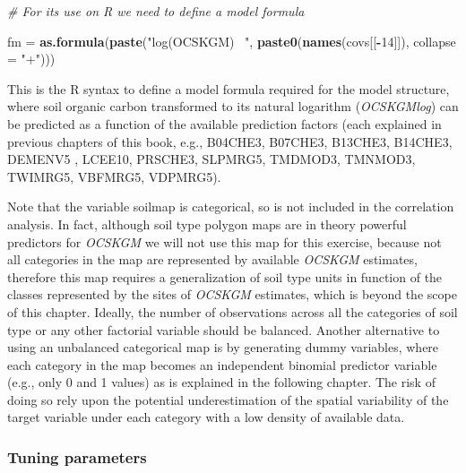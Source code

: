 \documentclass[10pt,b5paper,]{book}
\newenvironment{Shaded}{\begin{snugshade}}{\end{snugshade}}
\newcommand{\CommentTok}[1]{\textcolor[rgb]{0.56,0.35,0.01}{\textit{#1}}}
\newcommand{\DataTypeTok}[1]{\textcolor[rgb]{0.13,0.29,0.53}{#1}}
\newcommand{\DecValTok}[1]{\textcolor[rgb]{0.00,0.00,0.81}{#1}}
\newcommand{\KeywordTok}[1]{\textcolor[rgb]{0.13,0.29,0.53}{\textbf{#1}}}
\newcommand{\NormalTok}[1]{#1}
\newcommand{\OperatorTok}[1]{\textcolor[rgb]{0.81,0.36,0.00}{\textbf{#1}}}
\newcommand{\StringTok}[1]{\textcolor[rgb]{0.31,0.60,0.02}{#1}}
\theoremstyle{definition}
\theoremstyle{definition}
\theoremstyle{definition}
\theoremstyle{remark}
\begin{document}
\begin{Shaded}
\begin{Highlighting}[]
\CommentTok{# For its use on R we need to define a model formula}

\NormalTok{fm =}\StringTok{ }\KeywordTok{as.formula}\NormalTok{(}\KeywordTok{paste}\NormalTok{(}\StringTok{"log(OCSKGM) ~"}\NormalTok{, }\KeywordTok{paste0}\NormalTok{(}\KeywordTok{names}\NormalTok{(covs[[}\OperatorTok{-}\DecValTok{14}\NormalTok{]]),}
                                            \DataTypeTok{collapse =} \StringTok{"+"}\NormalTok{))) }
\end{Highlighting}
\end{Shaded}

This is the R syntax to define a model formula required for the model
structure, where soil organic carbon transformed to its natural
logarithm (\emph{OCSKGMlog}) can be predicted as a function of the
available prediction factors (each explained in previous chapters of
this book, e.g., B04CHE3, B07CHE3, B13CHE3, B14CHE3, DEMENV5 , LCEE10,
PRSCHE3, SLPMRG5, TMDMOD3, TMNMOD3, TWIMRG5, VBFMRG5, VDPMRG5).

Note that the variable soilmap is categorical, so is not included in the
correlation analysis. In fact, although soil type polygon maps are in
theory powerful predictors for \emph{OCSKGM} we will not use this map
for this exercise, because not all categories in the map are represented
by available \emph{OCSKGM} estimates, therefore this map requires a
generalization of soil type units in function of the classes represented
by the sites of \emph{OCSKGM} estimates, which is beyond the scope of
this chapter. Ideally, the number of observations across all the
categories of soil type or any other factorial variable should be
balanced. Another alternative to using an unbalanced categorical map is
by generating dummy variables, where each category in the map becomes an
independent binomial predictor variable (e.g., only 0 and 1 values) as
is explained in the following chapter. The risk of doing so rely upon
the potential underestimation of the spatial variability of the target
variable under each category with a low density of available data.

\hypertarget{tuning-parameters}{%
\subsubsection{Tuning parameters}\label{tuning-parameters}}
\end{document}
